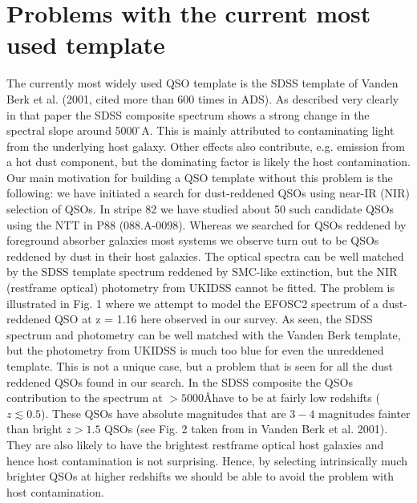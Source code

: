 \documentclass[iop]{emulateapj}
\begin{document}
\section{Problems with the current most used template}
The currently most widely used QSO template is the SDSS template of Vanden Berk et al. (2001, cited more than 600 times in ADS). As described very clearly in that paper the SDSS composite spectrum shows a strong change in the spectral slope around 5000  ̊A. This is mainly attributed to contaminating light from the underlying host galaxy. Other effects also contribute, e.g. emission from a hot dust component, but the dominating factor is likely the host contamination. Our main motivation for building a QSO template without this problem is the following: we have initiated a search for dust-reddened QSOs using near-IR (NIR) selection of QSOs. In stripe 82 we have studied about 50 such candidate QSOs using the NTT in P88 (088.A-0098). Whereas we searched for QSOs reddened by foreground absorber galaxies most systems we observe turn out to be QSOs reddened by dust in their host galaxies. The optical spectra can be well matched by the SDSS template spectrum reddened by SMC-like extinction, but the NIR (restframe optical) photometry from UKIDSS cannot be fitted. The problem is illustrated in Fig. 1 where we attempt to model the EFOSC2 spectrum of a dust-reddened QSO at z = 1.16 here observed in our survey. As seen, the SDSS spectrum and photometry can be well matched with the Vanden Berk template, but the photometry from UKIDSS is much too blue for even the unreddened template. This is not a unique case, but a problem that is seen for all the dust reddened QSOs found in our search.
In the SDSS composite the QSOs contribution to the spectrum at $ > 5000$\AA have to be at fairly low redshifts ($z \lesssim  0.5$). These QSOs have absolute magnitudes that are $3-4$ magnitudes fainter than bright $z > 1.5$ QSOs (see Fig. 2 taken from in Vanden Berk et al. 2001). They are also likely to have the brightest restframe optical host galaxies and hence host contamination is not surprising. Hence, by selecting intrinsically much brighter QSOs at higher redshifts we should be able to avoid the problem with host contamination.
\end{document}
